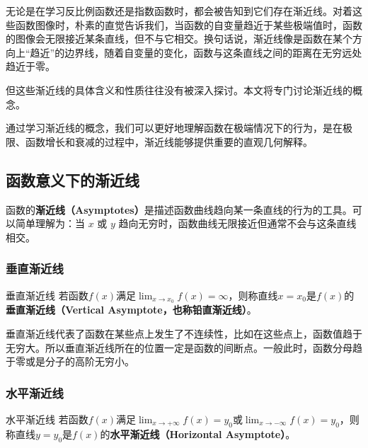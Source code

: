 
\begin{issues}
\issueDraft
\end{issues}

无论是在学习反比例函数还是指数函数时，都会被告知到它们存在渐近线。对着这些函数图像时，朴素的直觉告诉我们，当函数的自变量趋近于某些极端值时，函数的图像会无限接近某条直线，但不与它相交。换句话说，渐近线像是函数在某个方向上“趋近”的边界线，随着自变量的变化，函数与这条直线之间的距离在无穷远处趋近于零。

但这些渐近线的具体含义和性质往往没有被深入探讨。本文将专门讨论渐近线的概念。

通过学习渐近线的概念，我们可以更好地理解函数在极端情况下的行为，是在极限、函数增长和衰减的过程中，渐近线能够提供重要的直观几何解释。

\subsection{函数意义下的渐近线}

函数的\textbf{渐近线（Asymptotes）}是描述函数曲线趋向某一条直线的行为的工具。可以简单理解为：当  $x$  或  $y$  趋向无穷时，函数曲线无限接近但通常不会与这条直线相交。
\subsubsection{垂直渐近线}

\begin{definition}{垂直渐近线}
若函数$f(x)$满足$\displaystyle \lim_{x\to x_0}f(x)=\infty$，则称直线$x=x_0$是$f(x)$的\textbf{垂直渐近线（Vertical Asymptote，也称铅直渐近线）}。
\end{definition}

垂直渐近线代表了函数在某些点上发生了不连续性，比如在这些点上，函数值趋于无穷大。所以垂直渐近线所在的位置一定是函数的间断点。一般此时，函数分母趋于零或是分子的高阶无穷小。

\subsubsection{水平渐近线}

\begin{definition}{水平渐近线}
若函数$f(x)$满足$\displaystyle \lim_{x\to +\infty}f(x)=y_0$或$\displaystyle \lim_{x\to -\infty}f(x)=y_0$，则称直线$y=y_0$是$f(x)$的\textbf{水平渐近线（Horizontal Asymptote）}。
\end{definition}

